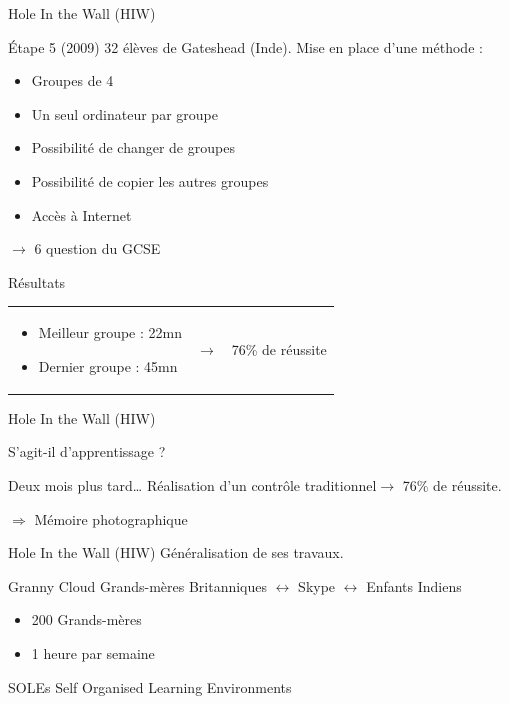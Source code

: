 \begin{frame}{Hole In the Wall (HIW)}
  \begin{block}{Étape 5 (2009)}
  32 élèves de Gateshead (Inde).
    Mise en place d'une méthode :
    \begin{itemize}
      \item Groupes de 4
      \item Un seul ordinateur par groupe
      \item Possibilité de changer de groupes
      \item Possibilité de copier les autres groupes
      \item Accès à Internet
    \end{itemize}
    $\rightarrow$ 6 question du GCSE
  \end{block}
  \pause
  \begin{block}{Résultats}
  \begin{tabular}{l c l}
    \begin{minipage}{0.5\textwidth}
      \begin{itemize}
        \item Meilleur groupe : 22mn
        \item Dernier groupe : 45mn
      \end{itemize}
    \end{minipage} &  $\rightarrow$ & 76\% de réussite \\
    \end{tabular}
  \end{block}
\end{frame}

\begin{frame}{Hole In the Wall (HIW)}

  S'agit-il d'apprentissage ?
  \pause
  \begin{block}{Deux mois plus tard\ldots}
    Réalisation d'un contrôle traditionnel\pause $\rightarrow$ 76\% de réussite.
    
    $\Rightarrow$ Mémoire photographique
  \end{block}
\end{frame}

\begin{frame}{Hole In the Wall (HIW)}
  Généralisation de ses travaux.
  \pause
  \begin{block}{Granny Cloud}
    Grands-mères Britanniques $\leftrightarrow$ Skype $\leftrightarrow$ Enfants Indiens
    \begin{itemize}
      \item 200 Grands-mères
      \item 1 heure par semaine
    \end{itemize}
  \end{block}
  \pause
    \begin{block}{SOLEs}
    Self Organised Learning Environments
  \end{block}
\end{frame}

